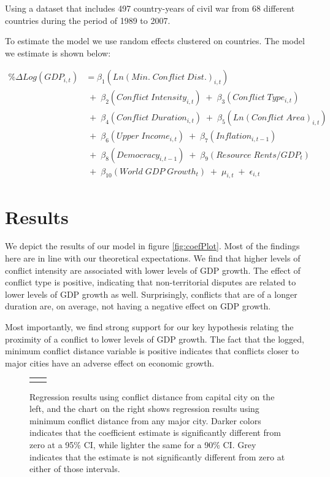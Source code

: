 Using a dataset that includes 497 country-years of civil war from 68 different countries during the period of 1989 to 2007. 

To estimate the model we use random effects clustered on countries. The model we estimate is shown below:

\begin{align*}
	\% \Delta Log(GDP_{i,t}) &= \beta_{1}(Ln(Min. \; Conflict \; Dist.)_{i,t}) \\
	& \;+\; \beta_{2}(Conflict \; Intensity_{i,t}) \;+\; \beta_{3}(Conflict \; Type_{i,t}) \\
	& \;+\; \beta_{4}(Conflict \; Duration_{i,t}) \;+\; \beta_{5}(Ln(Conflict \; Area)_{i,t}) \\	
	& \;+\; \beta_{6}(Upper \; Income_{i,t}) \;+\; \beta_{7}(Inflation_{i,t-1}) \\
	&  \;+\; \beta_{8}(Democracy_{i,t-1}) \;+\; \beta_{9}(Resource \; Rents/GDP_{t}) \\
	& \;+\; \beta_{10}(World \; GDP \; Growth_{t}) \;+\; \mu_{i,t} \;+\; \epsilon_{i,t}
\end{align*}

\section{Results}
\label{findings} 

We depict the results of our model in figure \ref{fig:coefPlot}. Most of the findings here are in line with our theoretical expectations. We find that higher levels of conflict intensity are associated with lower levels of GDP growth. The effect of conflict type is positive, indicating that non-territorial disputes are related to lower levels of GDP growth as well. Surprisingly, conflicts that are of a longer duration are, on average, not having a negative effect on GDP growth. 

Most importantly, we find strong support for our key hypothesis relating the proximity of a conflict to lower levels of GDP growth. The fact that the logged, minimum conflict distance variable is positive indicates that conflicts closer to major cities have an adverse effect on economic growth. 

\begin{figure}
	\centering
	\begin{tabular}{cc}
		\subfloat[SubFigure 1][Capital City]{
			\resizebox{.45\textwidth}{!}{}
		\label{fig:capCoef}} &
		\subfloat[SubFigure 2][Any City]{
			\resizebox{.45\textwidth}{!}{}
		\label{fig:cityCoef}}
	\end{tabular}
	\caption{Regression results using conflict distance from capital city on the left, and the chart on the right shows regression results using minimum conflict distance from any major city. Darker colors indicates that the coefficient estimate is significantly different from zero at a 95\% CI, while lighter the same for a 90\% CI. Grey indicates that the estimate is not significantly different from zero at either of those intervals.}
	\label{fig:coefplot}
\end{figure}

